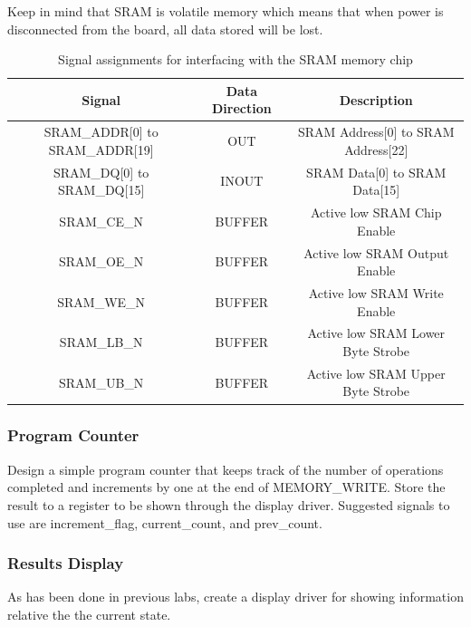 Keep in mind that SRAM is volatile memory which means that when power is disconnected from the board, all data stored will be lost. 

\begin {table}[H]
	\caption {Signal assignments for interfacing with the SRAM memory chip} 
	\label{tab:sram} 
	\begin{center}
    		\begin{tabular}{ | c | c | c |}
			\hline
 			{\bf Signal} & {\bf Data Direction} & {\bf Description}  \\ \hline
			SRAM\_ADDR[0] to SRAM\_ADDR[19] & OUT &  SRAM Address[0] to SRAM Address[22] \\ \hline
			SRAM\_DQ[0] to SRAM\_DQ[15] & INOUT & SRAM Data[0] to SRAM Data[15] \\ \hline
			SRAM\_CE\_N & BUFFER & Active low SRAM Chip Enable \\ \hline
			SRAM\_OE\_N & BUFFER & Active low SRAM Output Enable \\ \hline
			SRAM\_WE\_N & BUFFER & Active low SRAM Write Enable \\ \hline
			SRAM\_LB\_N & BUFFER & Active low SRAM Lower Byte Strobe \\ \hline
			SRAM\_UB\_N & BUFFER & Active low SRAM Upper Byte Strobe \\ 
			\hline
    		\end{tabular}
	\end{center}
\end{table}

\subsubsection{Program Counter}

Design a simple program counter that keeps track of the number of operations completed and increments by one at the end of MEMORY\_WRITE. Store the result to a register to be shown through the display driver. Suggested signals to use are increment\_flag, current\_count, and prev\_count.

\subsubsection{Results Display}
\label{sec:display}
As has been done in previous labs, create a display driver for showing information relative the the current state.

